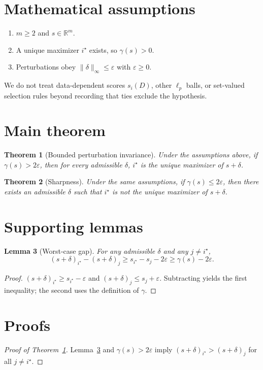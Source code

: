\documentclass[11pt]{article}
\newtheorem{theorem}{Theorem}
\newtheorem{lemma}[theorem]{Lemma}
\begin{document}
\section{Mathematical assumptions}
\begin{enumerate}
\item \(m\ge 2\) and \(s\in\mathbb{R}^m\).
\item A unique maximizer \(i^\star\) exists, so \(\gamma(s)>0\).
\item Perturbations obey \(\|\delta\|_\infty\le\varepsilon\) with \(\varepsilon\ge 0\).
\end{enumerate}
We do not treat data-dependent scores \(s_i(D)\), other \(\ell_p\) balls, or
set-valued selection rules beyond recording that ties exclude the hypothesis.

\section{Main theorem}
\begin{theorem}[Bounded perturbation invariance]\label{thm:main}
Under the assumptions above, if \(\gamma(s)>2\varepsilon\), then for every
admissible \(\delta\), \(i^\star\) is the unique maximizer of \(s+\delta\).
\end{theorem}

\begin{theorem}[Sharpness]\label{thm:sharp}
Under the same assumptions, if \(\gamma(s)\le 2\varepsilon\), then there exists
an admissible \(\delta\) such that \(i^\star\) is not the unique maximizer of
\(s+\delta\).
\end{theorem}

\section{Supporting lemmas}
\begin{lemma}[Worst-case gap]\label{lem:gap}
For any admissible \(\delta\) and any \(j\neq i^\star\),
\[
(s+\delta)_{i^\star}-(s+\delta)_j
\ge s_{i^\star}-s_j-2\varepsilon
\ge \gamma(s)-2\varepsilon.
\]
\end{lemma}

\begin{proof}
\((s+\delta)_{i^\star}\ge s_{i^\star}-\varepsilon\) and
\((s+\delta)_j\le s_j+\varepsilon\).
Subtracting yields the first inequality; the second uses the definition of
\(\gamma\).
\end{proof}

\section{Proofs}
\begin{proof}[Proof of Theorem~\ref{thm:main}]
Lemma~\ref{lem:gap} and \(\gamma(s)>2\varepsilon\) imply
\((s+\delta)_{i^\star}>(s+\delta)_j\) for all \(j\neq i^\star\).
\end{proof}
\end{document}
